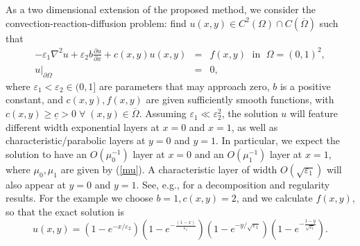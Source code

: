 \documentclass[11pt]{article}
\providecommand{\e}{\varepsilon}
\theoremstyle{plain}
\theoremstyle{definition}
\theoremstyle{remark}
\numberwithin{equation}{section}
\begin{document}
\noindent
As a two dimensional extension of the proposed method, we consider the convection-reaction-diffusion problem: find $u(x,y) \in C^2(\Omega) \cap C(\overline{\Omega})$ such that
%
\begin{eqnarray}
-\e_1 \nabla^2 u + \e_2 b \frac{\partial u}{\partial x} + c(x,y) u(x,y) &=& f(x,y) \; \text{ in } \; \Omega = (0,1)^2, \label{pde_2D}\\
u|_{\partial \Omega} &=& 0, \label{bc_2D}
\end{eqnarray}
%
where $\e_1 < \e_2 \in (0,1]$ are parameters that may approach zero, $b$ is a positive constant, and $c(x,y), f(x,y)$ are given sufficiently smooth functions, with $c(x,y) \ge \underline c>0 \; \forall \; (x,y) \in \overline{\Omega}$. Assuming $\e_1 \ll \e_2^2$, the solution $u$ will feature different width exponential layers at $x=0$ and $x=1$, as well as characteristic/parabolic layers at $y=0$ and $y=1$. In particular, we expect the solution to have an $O(\mu^{-1}_0)$ layer at $x=0$ and an $O(\mu^{-1}_1)$ layer at $x=1$, where $\mu_0, \mu_1$ are given by (\ref{mu}). A characteristic layer of width $O(\sqrt{\e_1})$ will also appear at $y=0$ and $y=1$. See, e.g., \cite{Irene} for a decomposition and regularity results. For the example we choose $b =1, c(x,y)=2$,
and we calculate $f(x,y)$, so that the exact solution is
$$
u(x, y)=\left(1-e^{-x / \varepsilon_2}\right)\left(1-e^{-\frac{(1-x)}{\varepsilon_1}} \right)\left(1-e^{-y / \sqrt{\varepsilon_1}}\right)\left(1-e^{-\frac{1-y}{\sqrt{\varepsilon_1}}}\right) .
$$
\end{document}

